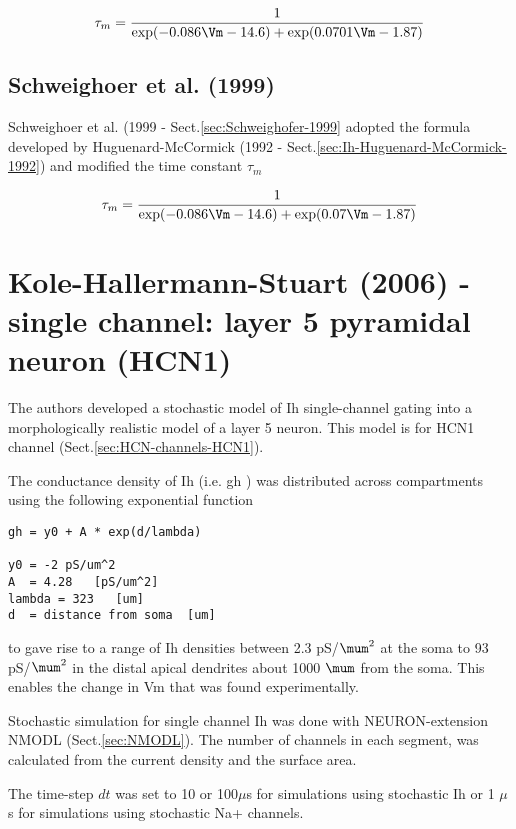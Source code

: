 \begin{equation}
\tau_m = \frac{1}{\exp(-0.086 \Vm - 14.6) + \exp(0.0701 \Vm - 1.87)}
\end{equation}



\subsection{Schweighoer et al. (1999)}
\label{sec:Ih-Schweighofer-1999}

Schweighoer et al. (1999 - Sect.\ref{sec:Schweighofer-1999} adopted the formula
developed by Huguenard-McCormick (1992 -
Sect.\ref{sec:Ih-Huguenard-McCormick-1992}) and modified the time constant
$\tau_m$

\begin{equation}
\tau_m = \frac{1}{\exp(-0.086 \Vm - 14.6) + \exp(0.07 \Vm - 1.87)}
\end{equation}



\section{Kole-Hallermann-Stuart (2006) - single channel: layer 5 pyramidal
neuron (HCN1)}
\label{sec:Ih-Kole2006}

The authors developed a stochastic model of Ih single-channel gating into a
morphologically realistic model of a layer 5 neuron. This model is for HCN1
channel (Sect.\ref{sec:HCN-channels-HCN1}).

The conductance density of Ih (i.e. gh ) was distributed across compartments
using the following exponential function
\begin{verbatim}
gh = y0 + A * exp(d/lambda)

y0 = -2 pS/um^2
A  = 4.28   [pS/um^2]
lambda = 323   [um]
d  = distance from soma  [um]
\end{verbatim}
to gave rise to a range of Ih densities between 2.3 pS/$\mum^2$ at the soma to
93 pS/$\mum^2$ in the distal apical dendrites about 1000 $\mum$ from the soma.
This enables the change in Vm that was found experimentally.

Stochastic simulation for single channel Ih was done with NEURON-extension
NMODL (Sect.\ref{sec:NMODL}). The number of channels in each segment, was
calculated from the current density and the surface area.

\begin{mdframed}
The time-step $dt$ was set to 10 or 100$\mu$s for simulations using stochastic
Ih or 1 $\mu$s for simulations using stochastic Na+ channels.
\end{mdframed}

